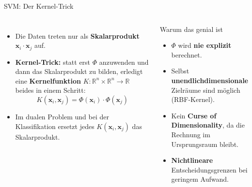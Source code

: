 \begin{frame}{SVM: Der Kernel-Trick}
\footnotesize
\begin{columns}
\begin{itemize}
  \item Die Daten treten nur als \textbf{Skalarprodukt}
        $\mathbf{x}_i\!\cdot\mathbf{x}_j$ auf.
  \item \textbf{Kernel-Trick:} statt erst $\Phi$ anzuwenden und dann das
        Skalarprodukt zu bilden, erledigt eine \textbf{Kernelfunktion}
        $K: \mathbb{R}^n \times \mathbb{R}^n \to \mathbb{R}$ beides in einem
        Schritt:
        \[
          K(\mathbf{x}_i, \mathbf{x}_j) = \Phi(\mathbf{x}_i)\cdot\Phi(\mathbf{x}_j)
        \]
  \item Im dualen Problem und bei der Klassifikation ersetzt jedes
        $K(\mathbf{x}_i, \mathbf{x}_j)$ das Skalarprodukt.
\end{itemize}

\begin{blockC1}{\footnotesize Warum das genial ist}
\begin{itemize}
  \item $\Phi$ wird \textbf{nie explizit} berechnet.
  \item Selbst \textbf{unendlichdimensionale} Zielräume sind möglich
        (RBF-Kernel).
  \item Kein \textbf{Curse of Dimensionality}, da die Rechnung im
        Ursprungsraum bleibt.
  \item \textbf{Nichtlineare} Entscheidungsgrenzen bei geringem Aufwand.
\end{itemize}
\end{blockC1}
\end{columns}
\end{frame}

